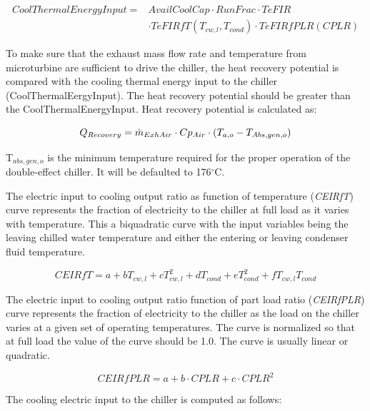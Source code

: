 \begin{equation}
\begin{split}
CoolThermalEnergyInput =& AvailCoolCap \cdot RunFrac \cdot TeFIR \\
& \cdot TeFIRfT\left( {{T_{cw,l}},{T_{cond}}} \right) \cdot TeFIRfPLR(CPLR)
\end{split}
\end{equation}

To make sure that the exhaust mass flow rate and temperature from microturbine are sufficient to drive the chiller, the heat recovery potential is compared with the cooling thermal energy input to the chiller (CoolThermalEergyInput). The heat recovery potential should be greater than the CoolThermalEnergyInput. Heat recovery potential is calculated as:

\begin{equation}
{Q_{Recovery}} = {\dot m_{ExhAir}} \cdot {\rm{}}C{p_{Air}} \cdot {\rm{}}({T_{a,o}} - {T_{Abs,gen,o}})
\end{equation}

T\(_{abs,gen,o}\) is the minimum temperature required for the proper operation of the double-effect chiller. It will be defaulted to 176\(^{\circ}\)C.

The electric input to cooling output ratio as function of temperature (\emph{CEIRfT}) curve represents the fraction of electricity to the chiller at full load as it varies with temperature. This a biquadratic curve with the input variables being the leaving chilled water temperature and either the entering or leaving condenser fluid temperature.

\begin{equation}
CEIRfT = a + b{T_{cw,l}} + cT_{cw,l}^2 + d{T_{cond}} + eT_{cond}^2 + f{T_{cw,l}}{T_{cond}}
\end{equation}

The electric input to cooling output ratio function of part load ratio (\emph{CEIRfPLR}) curve represents the fraction of electricity to the chiller as the load on the chiller varies at a given set of operating temperatures. The curve is normalized so that at full load the value of the curve should be 1.0. The curve is usually linear or quadratic.

\begin{equation}
CEIRfPLR = a + b \cdot CPLR + c \cdot CPL{R^2}
\end{equation}

The cooling electric input to the chiller is computed as follows:

